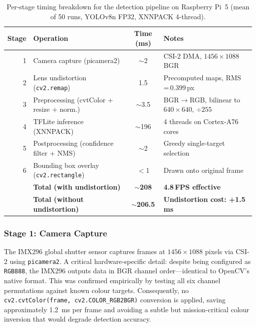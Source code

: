 \begin{table}[ht]
  \centering
  \caption{Per-stage timing breakdown for the detection pipeline on Raspberry Pi~5 (mean of 50 runs, YOLOv8n FP32, XNNPACK 4-thread).}\label{tab:pipeline_timing}
  \begin{tabular}{@{}r l c l@{}}
    \toprule
    \textbf{Stage} & \textbf{Operation} & \textbf{Time (ms)} & \textbf{Notes} \\
    \midrule
    1 & Camera capture (picamera2) & $\sim$2 & CSI-2 DMA, $1456\!\times\!1088$ BGR \\
    2 & Lens undistortion (\texttt{cv2.remap}) & 1.5 & Precomputed maps, RMS\,=\,0.399\,px \\
    3 & Preprocessing (cvtColor + resize + norm.) & $\sim$3.5 & BGR$\to$RGB, bilinear to $640\!\times\!640$, $\div 255$ \\
    4 & TFLite inference (XNNPACK) & $\sim$196 & 4 threads on Cortex-A76 cores \\
    5 & Postprocessing (confidence filter + NMS) & $\sim$2 & Greedy single-target selection \\
    6 & Bounding box overlay (\texttt{cv2.rectangle}) & $<$1 & Drawn onto original frame \\
    \midrule
    & \textbf{Total (with undistortion)} & \textbf{$\sim$208} & \textbf{4.8\,FPS effective} \\
    & \textbf{Total (without undistortion)} & \textbf{$\sim$206.5} & \textbf{Undistortion cost: +1.5\,ms} \\
    \bottomrule
  \end{tabular}
\end{table}

\subsubsection{Stage 1: Camera Capture}

The IMX296 global shutter sensor captures frames at $1456 \times 1088$ pixels via CSI-2 using \texttt{picamera2}.  A critical hardware-specific detail: despite being configured as \texttt{RGB888}, the IMX296 outputs data in BGR channel order---identical to OpenCV's native format.  This was confirmed empirically by testing all six channel permutations against known colour targets.  Consequently, no \texttt{cv2.cvtColor(frame, cv2.COLOR\_RGB2BGR)} conversion is applied, saving approximately \SI{1.2}{\milli\second} per frame and avoiding a subtle but mission-critical colour inversion that would degrade detection accuracy.


